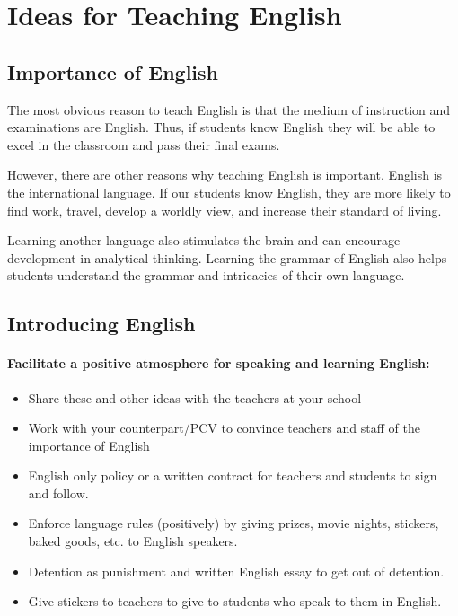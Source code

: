 \documentclass[12pt,a4paper]{report}
\begin{document}

\chapter{Ideas for Teaching English}

\section{Importance of English}

The most obvious reason to teach English is that the medium of instruction and examinations are English. Thus, if students know English they will be able to excel in the classroom and pass their final exams. 

However, there are other reasons why teaching English is important. English is the international language. If our students know English, they are more likely to find work, travel, develop a worldly view, and increase their standard of living. 

Learning another language also stimulates the brain and can encourage development in analytical thinking. Learning the grammar of English also helps students understand the grammar and intricacies of their own language. 

\section{Introducing English}

\subsubsection{Facilitate a positive atmosphere for speaking and learning English:}
\begin{itemize}
\item{Share these and other ideas with the teachers at your school}

\item{Work with your counterpart/PCV to convince teachers and staff of the importance of English}

\item{English only policy or a written contract for teachers and students to sign and follow.}

\item{Enforce language rules (positively) by giving prizes, movie nights, stickers, baked goods, etc. to English speakers.}

\item{Detention as punishment and written English essay to get out of detention.}

\item{Give stickers to teachers to give to students who speak to them in English.}
\end{itemize}
\end{document}
